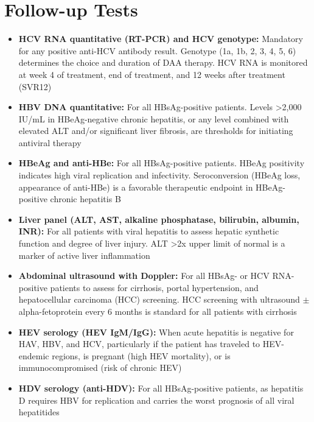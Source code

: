 \section*{Follow-up Tests}
\begin{itemize}
  \item \textbf{HCV RNA quantitative (RT-PCR) and HCV genotype:} Mandatory for any positive anti-HCV antibody result. Genotype (1a, 1b, 2, 3, 4, 5, 6) determines the choice and duration of DAA therapy. HCV RNA is monitored at week 4 of treatment, end of treatment, and 12 weeks after treatment (SVR12)
  \item \textbf{HBV DNA quantitative:} For all HBsAg-positive patients. Levels >2,000 IU/mL in HBeAg-negative chronic hepatitis, or any level combined with elevated ALT and/or significant liver fibrosis, are thresholds for initiating antiviral therapy
  \item \textbf{HBeAg and anti-HBe:} For all HBsAg-positive patients. HBeAg positivity indicates high viral replication and infectivity. Seroconversion (HBeAg loss, appearance of anti-HBe) is a favorable therapeutic endpoint in HBeAg-positive chronic hepatitis B
  \item \textbf{Liver panel (ALT, AST, alkaline phosphatase, bilirubin, albumin, INR):} For all patients with viral hepatitis to assess hepatic synthetic function and degree of liver injury. ALT >2x upper limit of normal is a marker of active liver inflammation
  \item \textbf{Abdominal ultrasound with Doppler:} For all HBsAg- or HCV RNA-positive patients to assess for cirrhosis, portal hypertension, and hepatocellular carcinoma (HCC) screening. HCC screening with ultrasound $\pm$ alpha-fetoprotein every 6 months is standard for all patients with cirrhosis
  \item \textbf{HEV serology (HEV IgM/IgG):} When acute hepatitis is negative for HAV, HBV, and HCV, particularly if the patient has traveled to HEV-endemic regions, is pregnant (high HEV mortality), or is immunocompromised (risk of chronic HEV)
  \item \textbf{HDV serology (anti-HDV):} For all HBsAg-positive patients, as hepatitis D requires HBV for replication and carries the worst prognosis of all viral hepatitides
\end{itemize}

